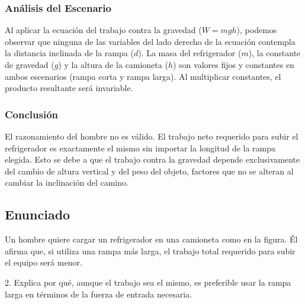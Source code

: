 \documentclass[a4paper,12pt]{article}
\begin{document}
\subsubsection*{Análisis del Escenario}
Al aplicar la ecuación del trabajo contra la gravedad ($W = mgh$), podemos observar que ninguna de las variables del lado derecho de la ecuación contempla la distancia inclinada de la rampa ($d$). La masa del refrigerador ($m$), la constante de gravedad ($g$) y la altura de la camioneta ($h$) son valores fijos y constantes en ambos escenarios (rampa corta y rampa larga). Al multiplicar constantes, el producto resultante será invariable.

\subsubsection*{Conclusión}
El razonamiento del hombre no es válido. El trabajo neto requerido para subir el refrigerador es exactamente el mismo sin importar la longitud de la rampa elegida. Esto se debe a que el trabajo contra la gravedad depende exclusivamente del cambio de altura vertical y del peso del objeto, factores que no se alteran al cambiar la inclinación del camino.

\newpage
\subsection*{Enunciado}
Un hombre quiere cargar un refrigerador en una camioneta como en la figura. Él afirma que, si utiliza una rampa más larga, el trabajo total requerido para subir el equipo será menor. 

2. Explica por qué, aunque el trabajo sea el mismo, es preferible usar la rampa larga en términos de la fuerza de entrada necesaria.

\begin{center}
\end{center}
\end{document}
